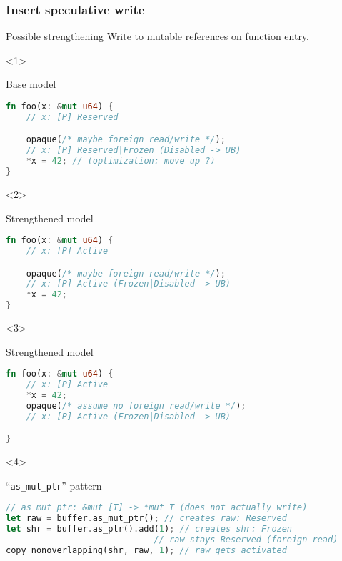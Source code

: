 \begin{frame}[fragile, t]
    \frametitle{Insert speculative write}

    \begin{exampleblock}{Possible strengthening}
        Write to mutable references on function entry.
    \end{exampleblock}

    \begin{onlyenv}<1>
        \begin{block}{{\xmark} Base model}
            \begin{lstlisting}[language=rust, basicstyle=\ttfamily\scriptsize]
fn foo(x: &mut u64) {
    // x: [P] Reserved

    opaque(/* maybe foreign read/write */);
    // x: [P] Reserved|Frozen (Disabled -> UB)
    *x = 42; // (optimization: move up ?)
}
            \end{lstlisting}
        \end{block}
    \end{onlyenv}

    \begin{onlyenv}<2>
        \begin{block}{{\cmark} Strengthened model}
            \begin{lstlisting}[language=rust, basicstyle=\ttfamily\scriptsize]
fn foo(x: &mut u64) {
    // x: [P] Active

    opaque(/* maybe foreign read/write */);
    // x: [P] Active (Frozen|Disabled -> UB)
    *x = 42;
}
            \end{lstlisting}
        \end{block}
    \end{onlyenv}

    \begin{onlyenv}<3>
        \begin{block}{{\cmark} Strengthened model}
            \begin{lstlisting}[language=rust, basicstyle=\ttfamily\scriptsize]
fn foo(x: &mut u64) {
    // x: [P] Active
    *x = 42;
    opaque(/* assume no foreign read/write */);
    // x: [P] Active (Frozen|Disabled -> UB)

}
            \end{lstlisting}
        \end{block}
    \end{onlyenv}

    \begin{onlyenv}<4>
        \begin{block}{{\cmark} ``\texttt{as\_mut\_ptr}'' pattern}
            \begin{lstlisting}[language=rust, basicstyle=\ttfamily\scriptsize]
// as_mut_ptr: &mut [T] -> *mut T (does not actually write)
let raw = buffer.as_mut_ptr(); // creates raw: Reserved
let shr = buffer.as_ptr().add(1); // creates shr: Frozen
                             // raw stays Reserved (foreign read)
copy_nonoverlapping(shr, raw, 1); // raw gets activated
            \end{lstlisting}
        \end{block}
    \end{onlyenv}


\end{frame}
